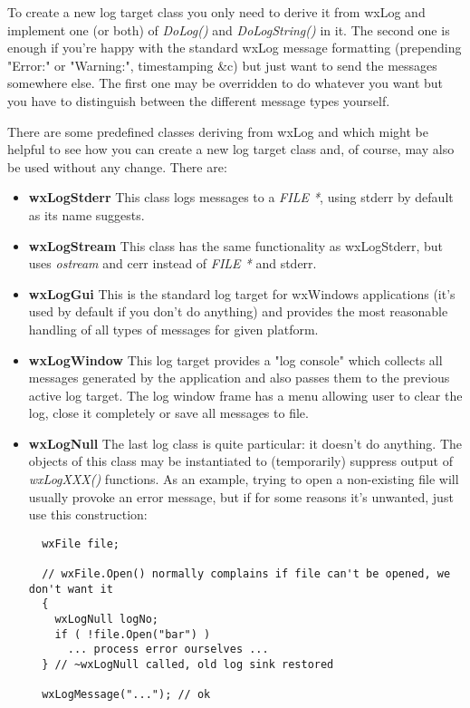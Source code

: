 To create a new log target class you only need to derive it from wxLog and
implement one (or both) of {\it DoLog()} and {\it DoLogString()} in it. The
second one is enough if you're happy with the standard wxLog message
formatting (prepending "Error:" or "Warning:", timestamping \&c) but just want
to send the messages somewhere else. The first one may be overridden to do
whatever you want but you have to distinguish between the different message
types yourself.

There are some predefined classes deriving from wxLog and which might be
helpful to see how you can create a new log target class and, of course, may
also be used without any change. There are:

\begin{itemize}\itemsep=0pt
\item{\bf wxLogStderr} This class logs messages to a {\it FILE *}, using
stderr by default as its name suggests.
\item{\bf wxLogStream} This class has the same functionality as wxLogStderr,
but uses {\it ostream} and cerr instead of {\it FILE *} and stderr.
\item{\bf wxLogGui} This is the standard log target for wxWindows
applications (it's used by default if you don't do anything) and provides the
most reasonable handling of all types of messages for given platform.
\item{\bf wxLogWindow} This log target provides a "log console" which
collects all messages generated by the application and also passes them to the
previous active log target. The log window frame has a menu allowing user to
clear the log, close it completely or save all messages to file.
\item{\bf wxLogNull} The last log class is quite particular: it doesn't do
anything. The objects of this class may be instantiated to (temporarily)
suppress output of {\it wxLogXXX()} functions. As an example, trying to open a
non-existing file will usually provoke an error message, but if for some
reasons it's unwanted, just use this construction:

{\small
\begin{verbatim}
  wxFile file;

  // wxFile.Open() normally complains if file can't be opened, we don't want it
  {
    wxLogNull logNo;
    if ( !file.Open("bar") )
      ... process error ourselves ...
  } // ~wxLogNull called, old log sink restored
  
  wxLogMessage("..."); // ok
\end{verbatim}
}
\end{itemize}

